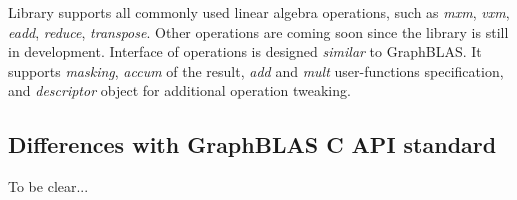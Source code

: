 Library supports all commonly used linear algebra operations, such as \textit{mxm}, \textit{vxm}, \textit{eadd}, \textit{reduce}, \textit{transpose}. 
Other operations are coming soon since the library is still in development.
Interface of operations is designed \textit{similar} to GraphBLAS. 
It supports \textit{masking}, \textit{accum} of the result, \textit{add} and \textit{mult} user-functions specification, and \textit{descriptor} object for additional operation tweaking.

\subsection{Differences with GraphBLAS C API standard}
To be clear...
